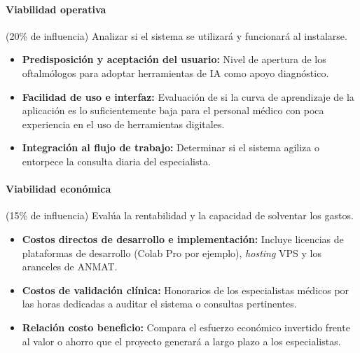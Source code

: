             \vspace{-0.5 cm}
            \paragraph{Viabilidad operativa} (20\% de influencia) Analizar si el sistema se utilizará y funcionará al instalarse.
        
            \begin{itemize}
                \item \textbf{Predisposición y aceptación del usuario:} Nivel de apertura de los oftalmólogos para adoptar herramientas de IA como apoyo diagnóstico.  
                
                \item \textbf{Facilidad de uso e interfaz:} Evaluación de si la curva de aprendizaje de la aplicación es lo suficientemente baja para el personal médico con poca experiencia en el uso de herramientas digitales.  
                
                \item \textbf{Integración al flujo de trabajo:} Determinar si el sistema agiliza o entorpece la consulta diaria del especialista. 
            \end{itemize}

            \vspace{-0.5 cm}
            \paragraph{Viabilidad económica} (15\% de influencia) Evalúa la rentabilidad y la capacidad de solventar los gastos.
        
            \begin{itemize}
                \item \textbf{Costos directos de desarrollo e implementación:} Incluye licencias de plataformas de desarrollo (Colab Pro por ejemplo), \textit{hosting} VPS y los aranceles de ANMAT.  
                
                \item \textbf{Costos de validación clínica:} Honorarios de los especialistas médicos por las horas dedicadas a auditar el sistema o consultas pertinentes.  
                
                \item \textbf{Relación costo beneficio:} Compara el esfuerzo económico invertido frente al valor o ahorro que el proyecto generará a largo plazo a los especialistas.
            \end{itemize}
        

